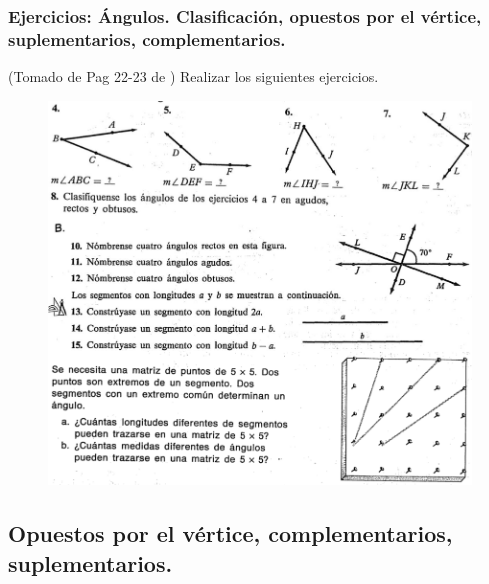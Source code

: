 \newpage


\begin{center}
	\vspace{-1cm}
	\subsubsection{Ejercicios:  Ángulos. Clasificación, opuestos por el vértice, suplementarios, complementarios.}\label{ejercicios_subseccion_angulos_intro}
\end{center}
(Tomado de Pag 22-23 de \cite{clemens}) Realizar los siguientes ejercicios.
\begin{figure}[H]
	\centering
	\includegraphics[width=1\linewidth]{Geometria/imgs/ejercicios_clemens_angulos}
\end{figure}

\newpage

\subsection{Opuestos por el vértice, complementarios, suplementarios.} \label{subsection_opuestosvertices_complementarios_suplementarios}

